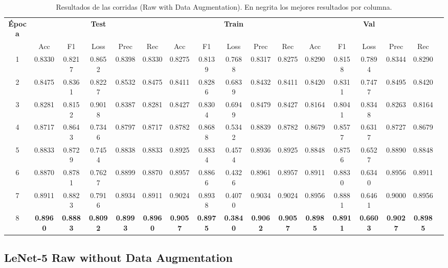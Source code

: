 \documentclass[conference]{IEEEtran}
\begin{document}
\begin{table}[h]
\scriptsize
\caption{Resultados de las corridas (Raw with Data Augmentation). En negrita los mejores resultados por columna.}
\centering
\begin{tabular}{|c|c|c|c|c|c|c|c|c|c|c|c|c|c|c|c|c|}
\hline
\textbf{Época} & \multicolumn{5}{c|}{\textbf{Test}} & \multicolumn{5}{c|}{\textbf{Train}} & \multicolumn{5}{c|}{\textbf{Val}} \\
\cline{2-16}
 & Acc & F1 & Loss & Prec & Rec & Acc & F1 & Loss & Prec & Rec & Acc & F1 & Loss & Prec & Rec \\
\hline
1 & 0.8330 & 0.8217 & 0.8652 & 0.8398 & 0.8330 & 0.8275 & 0.8139 & 0.7688 & 0.8317 & 0.8275 & 0.8290 & 0.8158 & 0.7894 & 0.8344 & 0.8290 \\
2 & 0.8475 & 0.8361 & 0.8227 & 0.8532 & 0.8475 & 0.8411 & 0.8286 & 0.6839 & 0.8432 & 0.8411 & 0.8420 & 0.8311 & 0.7477 & 0.8495 & 0.8420 \\
3 & 0.8281 & 0.8152 & 0.9018 & 0.8387 & 0.8281 & 0.8427 & 0.8304 & 0.6949 & 0.8479 & 0.8427 & 0.8164 & 0.8041 & 0.8348 & 0.8263 & 0.8164 \\
4 & 0.8717 & 0.8643 & 0.7346 & 0.8797 & 0.8717 & 0.8782 & 0.8688 & 0.5342 & 0.8839 & 0.8782 & 0.8679 & 0.8577 & 0.6317 & 0.8727 & 0.8679 \\
5 & 0.8833 & 0.8729 & 0.7454 & 0.8838 & 0.8833 & 0.8925 & 0.8834 & 0.4574 & 0.8936 & 0.8925 & 0.8848 & 0.8756 & 0.6527 & 0.8890 & 0.8848 \\
6 & 0.8870 & 0.8781 & 0.7627 & 0.8899 & 0.8870 & 0.8957 & 0.8866 & 0.4326 & 0.8961 & 0.8957 & 0.8911 & 0.8830 & 0.6340 & 0.8956 & 0.8911 \\
7 & 0.8911 & 0.8823 & 0.7916 & 0.8934 & 0.8911 & 0.9024 & 0.8938 & 0.4070 & 0.9034 & 0.9024 & 0.8956 & 0.8881 & 0.6461 & 0.9000 & 0.8956 \\
8 & \textbf{0.8960} & \textbf{0.8883} & \textbf{0.8092} & \textbf{0.8993} & \textbf{0.8960} & \textbf{0.9057} & \textbf{0.8975} & \textbf{0.3840} & \textbf{0.9062} & \textbf{0.9057} & \textbf{0.8985} & \textbf{0.8911} & \textbf{0.6603} & \textbf{0.9027} & \textbf{0.8985} \\
\hline
\end{tabular}
\label{tab:raw_aug_results}
\end{table}

\subsection{LeNet-5 Raw without Data Augmentation}
\end{document}
